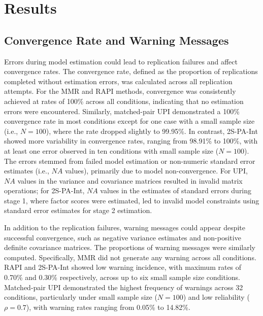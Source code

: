 \documentclass[
  man,mask]{apa6}
\begin{document}
\section{Results}\label{results}

\subsection{Convergence Rate and Warning Messages}\label{convergence-rate-and-warning-messages}

Errors during model estimation could lead to replication failures and affect convergence rates. The convergence rate, defined as the proportion of replications completed without estimation errors, was calculated across all replication attempts. For the MMR and RAPI methods, convergence was consistently achieved at rates of 100\% across all conditions, indicating that no estimation errors were encountered. Similarly, matched-pair UPI demonstrated a 100\% convergence rate in most conditions except for one case with a small sample size (i.e., \(\textit{N} = 100\)), where the rate dropped slightly to 99.95\%. In contrast, 2S-PA-Int showed more variability in convergence rates, ranging from 98.91\% to 100\%, with at least one error observed in ten conditions with small sample size (\(\textit{N} = 100\)). The errors stemmed from failed model estimation or non-numeric standard error estimates (i.e., \(\textit{NA}\) values), primarily due to model non-convergence. For UPI, \(\textit{NA}\) values in the variance and covariance matrices resulted in invalid matrix operations; for 2S-PA-Int, \(\textit{NA}\) values in the estimates of standard errors during stage 1, where factor scores were estimated, led to invalid model constraints using standard error estimates for stage 2 estimation.

In addition to the replication failures, warning messages could appear despite successful convergence, such as negative variance estimates and non-positive definite covariance matrices. The proportions of warning messages were similarly computed. Specifically, MMR did not generate any warning across all conditions. RAPI and 2S-PA-Int showed low warning incidence, with maximum rates of 0.70\% and 0.30\% respectively, across up to six small sample size conditions. Matched-pair UPI demonstrated the highest frequency of warnings across 32 conditions, particularly under small sample size (\(\textit{N} = 100\)) and low reliability (\(\rho = 0.7\)), with warning rates ranging from 0.05\% to 14.82\%.
\end{document}
